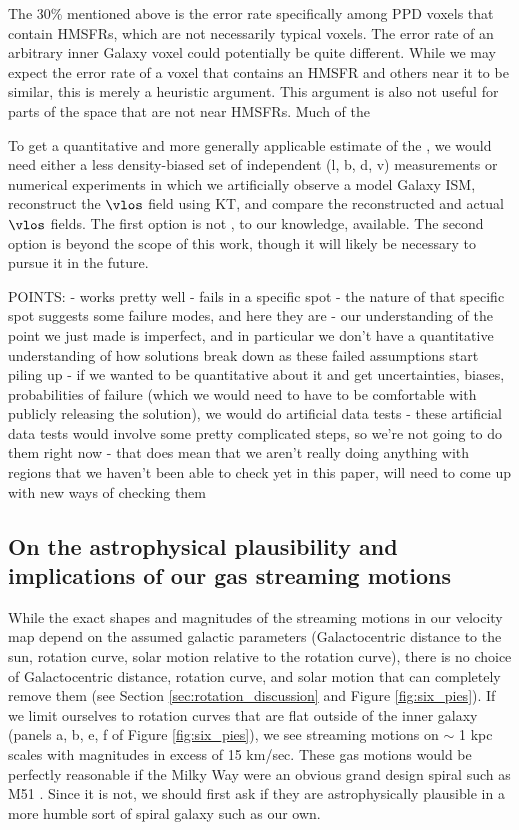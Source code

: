The 30\% mentioned above is the error rate specifically among PPD voxels that contain HMSFRs, which are not necessarily typical voxels. 
The error rate of an arbitrary inner Galaxy voxel could potentially be quite different. 
While we may expect the error rate of a voxel that contains an HMSFR and others near it to be similar, this is merely a heuristic argument.
This argument is also not useful for parts of the space that are not near HMSFRs.
Much of the 

To get a quantitative and more generally applicable estimate of the , we would need either a less density-biased set of independent (l, b, d, v) measurements or numerical experiments in which we artificially observe a model Galaxy ISM, reconstruct the $\vlos$ field using KT, and compare the reconstructed and actual $\vlos$ fields. 
The first option is not , to our knowledge, available. 
The second option is beyond the scope of this work, though it will likely be necessary to pursue it in the future. 



POINTS:
    - works pretty well
    - fails in a specific spot
    - the nature of that specific spot suggests some failure modes, and here they are
    - our understanding of the point we just made is imperfect, and in particular we don't have a quantitative understanding of how solutions break down as these failed assumptions start piling up
    - if we wanted to be quantitative about it and get uncertainties, biases, probabilities of failure (which we would need to have to be comfortable with publicly releasing the solution), we would do artificial data tests
    - these artificial data tests would involve some pretty complicated steps, so we're not going to do them right now
    - that does mean that we aren't really doing anything with regions that we haven't been able to check yet in this paper, will need to come up with new ways of checking them



\subsection{On the astrophysical plausibility and implications of our gas streaming motions}
\label{sec:discussion-plausibility}
While the exact shapes and magnitudes of the streaming motions in our velocity map depend on the assumed galactic parameters (Galactocentric distance to the sun, rotation curve, solar motion relative to the rotation curve), there is no choice of Galactocentric distance, rotation curve, and solar motion that can completely remove them (see Section \ref{sec:rotation_discussion} and Figure \ref{fig:six_pies}).
If we limit ourselves to rotation curves that are flat outside of the inner galaxy (panels a, b, e, f of Figure \ref{fig:six_pies}), we see streaming motions on $\sim$ 1 kpc scales with magnitudes in excess of 15 km/sec. 
These gas motions would be perfectly reasonable if the Milky Way were an obvious grand design spiral such as M51 \citep{Meidt_2013}. 
Since it is not, we should first ask if they are astrophysically plausible in a more humble sort of spiral galaxy such as our own. 

